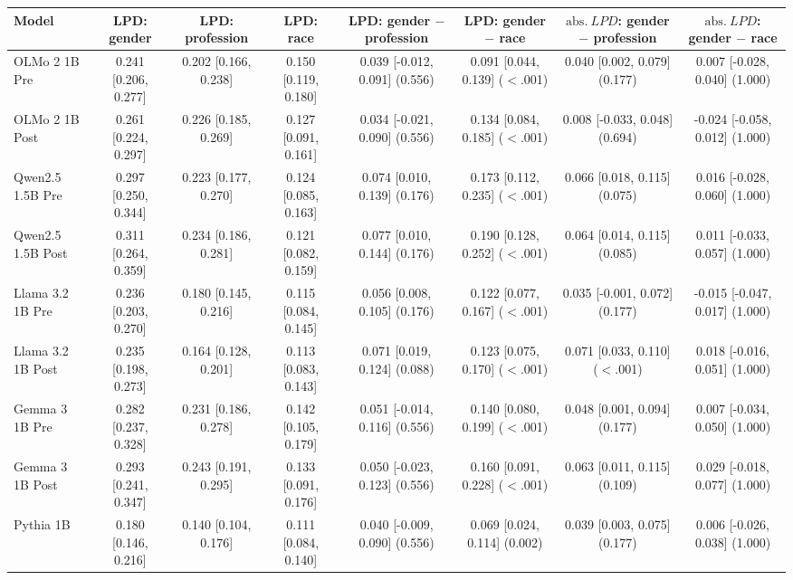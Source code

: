 \begin{tabular}{lccccccc}
\toprule
Model & LPD: gender & LPD: profession & LPD: race & LPD: gender $-$ profession & LPD: gender $-$ race & $\mathrm{abs.}\ LPD$: gender $-$ profession & $\mathrm{abs.}\ LPD$: gender $-$ race \\
\midrule
OLMo 2 1B Pre & 0.241 [0.206, 0.277] & 0.202 [0.166, 0.238] & 0.150 [0.119, 0.180] & 0.039 [-0.012, 0.091] (0.556) & 0.091 [0.044, 0.139] ($<$.001) & 0.040 [0.002, 0.079] (0.177) & 0.007 [-0.028, 0.040] (1.000) \\
OLMo 2 1B Post & 0.261 [0.224, 0.297] & 0.226 [0.185, 0.269] & 0.127 [0.091, 0.161] & 0.034 [-0.021, 0.090] (0.556) & 0.134 [0.084, 0.185] ($<$.001) & 0.008 [-0.033, 0.048] (0.694) & -0.024 [-0.058, 0.012] (1.000) \\
Qwen2.5 1.5B Pre & 0.297 [0.250, 0.344] & 0.223 [0.177, 0.270] & 0.124 [0.085, 0.163] & 0.074 [0.010, 0.139] (0.176) & 0.173 [0.112, 0.235] ($<$.001) & 0.066 [0.018, 0.115] (0.075) & 0.016 [-0.028, 0.060] (1.000) \\
Qwen2.5 1.5B Post & 0.311 [0.264, 0.359] & 0.234 [0.186, 0.281] & 0.121 [0.082, 0.159] & 0.077 [0.010, 0.144] (0.176) & 0.190 [0.128, 0.252] ($<$.001) & 0.064 [0.014, 0.115] (0.085) & 0.011 [-0.033, 0.057] (1.000) \\
Llama 3.2 1B Pre & 0.236 [0.203, 0.270] & 0.180 [0.145, 0.216] & 0.115 [0.084, 0.145] & 0.056 [0.008, 0.105] (0.176) & 0.122 [0.077, 0.167] ($<$.001) & 0.035 [-0.001, 0.072] (0.177) & -0.015 [-0.047, 0.017] (1.000) \\
Llama 3.2 1B Post & 0.235 [0.198, 0.273] & 0.164 [0.128, 0.201] & 0.113 [0.083, 0.143] & 0.071 [0.019, 0.124] (0.088) & 0.123 [0.075, 0.170] ($<$.001) & 0.071 [0.033, 0.110] ($<$.001) & 0.018 [-0.016, 0.051] (1.000) \\
Gemma 3 1B Pre & 0.282 [0.237, 0.328] & 0.231 [0.186, 0.278] & 0.142 [0.105, 0.179] & 0.051 [-0.014, 0.116] (0.556) & 0.140 [0.080, 0.199] ($<$.001) & 0.048 [0.001, 0.094] (0.177) & 0.007 [-0.034, 0.050] (1.000) \\
Gemma 3 1B Post & 0.293 [0.241, 0.347] & 0.243 [0.191, 0.295] & 0.133 [0.091, 0.176] & 0.050 [-0.023, 0.123] (0.556) & 0.160 [0.091, 0.228] ($<$.001) & 0.063 [0.011, 0.115] (0.109) & 0.029 [-0.018, 0.077] (1.000) \\
Pythia 1B & 0.180 [0.146, 0.216] & 0.140 [0.104, 0.176] & 0.111 [0.084, 0.140] & 0.040 [-0.009, 0.090] (0.556) & 0.069 [0.024, 0.114] (0.002) & 0.039 [0.003, 0.075] (0.177) & 0.006 [-0.026, 0.038] (1.000) \\
\bottomrule
\end{tabular}
